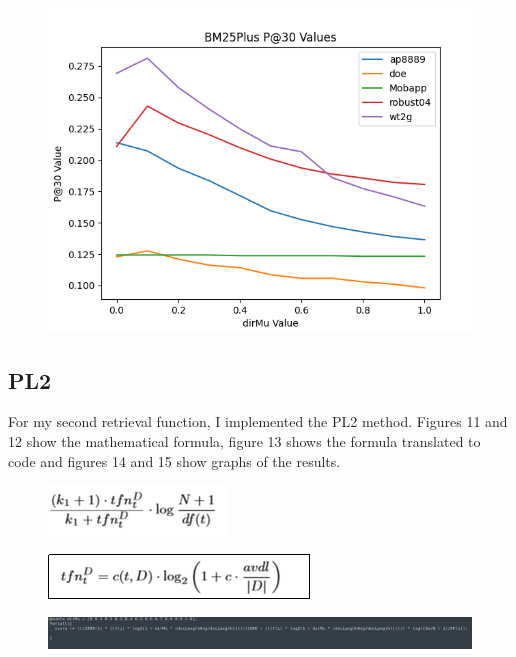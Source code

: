 \documentclass{article}
\begin{document}
\begin{figure}[h!]
\centering
\includegraphics[scale=0.40]{BM25Plus_P30_VALUES.png}
\caption{}
\end{figure}
\clearpage

\subsection*{PL2}
For my second retrieval function, I implemented the PL2 method.  Figures 11 and 12 show the mathematical formula, figure 13 shows the formula translated to code and figures 14 and 15 show graphs of the results.\\

\begin{figure}[h!]
\centering
\includegraphics[scale=0.45]{PL2_FORMULA_MATH_1.png}
\caption{}
\end{figure}

\begin{figure}[h!]
\centering
\includegraphics[scale=0.45]{PL2_FORMULA_MATH_2.png}
\caption{}
\end{figure}

\begin{figure}[h!]
\centering
\includegraphics[scale=0.45]{PL2_FORMULA.png}
\caption{}
\end{figure}
\end{document}
